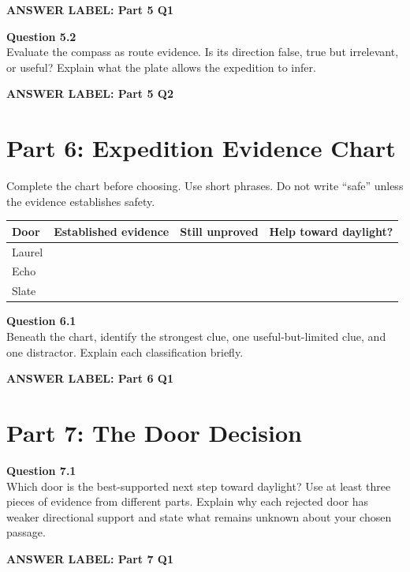 \documentclass[12pt]{article}
\newcommand{\answerbox}[2]{%
\vspace{0.12em}\noindent\textbf{#1}\par\vspace{0.04em}
\noindent\fbox{\begin{minipage}[t][#2]{\dimexpr\textwidth-2\fboxsep-2\fboxrule}\rule{\textwidth}{0pt}\vspace{#2}\end{minipage}}\par\vspace{0.22em}}
\begin{document}
\answerbox{ANSWER LABEL: Part 5 Q1}{2.35in}

\textbf{Question 5.2}\\[-0.15em]
Evaluate the compass as route evidence. Is its direction false, true but irrelevant, or useful? Explain what the plate allows the expedition to infer.

\answerbox{ANSWER LABEL: Part 5 Q2}{1.75in}

\newpage

\section*{Part 6: Expedition Evidence Chart}

Complete the chart before choosing. Use short phrases. Do not write ``safe'' unless the evidence establishes safety.

\renewcommand{\arraystretch}{1.5}
\begin{tabular}{|p{}|p{}|p{}|p{}|}
\hline
\textbf{Door} & \textbf{Established evidence} & \textbf{Still unproved} & \textbf{Help toward daylight?}\\ \hline
Laurel & & & \\[0.52in] \hline
Echo & & & \\[0.52in] \hline
Slate & & & \\[0.52in] \hline
\end{tabular}

\vspace{0.35em}
\textbf{Question 6.1}\\[-0.15em]
Beneath the chart, identify the strongest clue, one useful-but-limited clue, and one distractor. Explain each classification briefly.

\answerbox{ANSWER LABEL: Part 6 Q1}{1.75in}

\newpage

\section*{Part 7: The Door Decision}

\textbf{Question 7.1}\\[-0.15em]
Which door is the best-supported next step toward daylight? Use at least three pieces of evidence from different parts. Explain why each rejected door has weaker directional support and state what remains unknown about your chosen passage.

\answerbox{ANSWER LABEL: Part 7 Q1}{2.3in}
\end{document}
